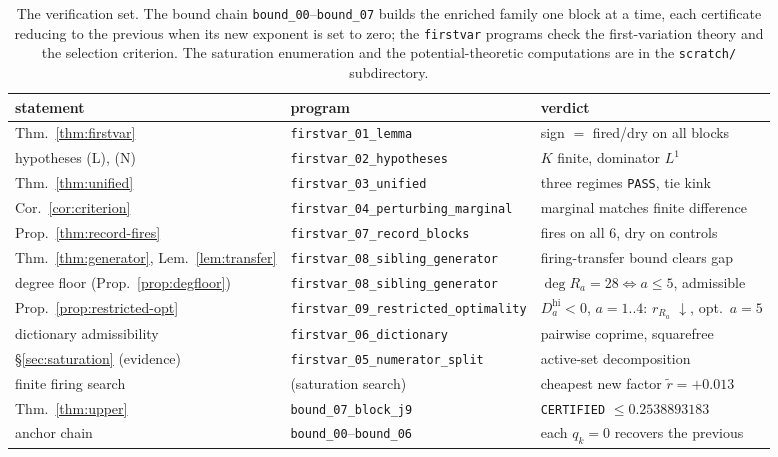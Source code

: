 \documentclass[11pt,reqno]{amsart}
\theoremstyle{plain}
\theoremstyle{definition}
\theoremstyle{remark}
\newcommand{\rb}[1]{r_{#1}}   %
\begin{document}
\begin{table}[ht]
\centering\small
\renewcommand{\arraystretch}{1.15}
\begin{tabular}{@{}lll@{}}
\toprule
statement & program & verdict\\
\midrule
Thm.~\ref{thm:firstvar} & \texttt{firstvar\_01\_lemma} & sign $=$ fired/dry on all blocks\\
\quad hypotheses (L), (N) & \texttt{firstvar\_02\_hypotheses} & $K$ finite, dominator $L^1$\\
Thm.~\ref{thm:unified} & \texttt{firstvar\_03\_unified} & three regimes \texttt{PASS}, tie kink\\
Cor.~\ref{cor:criterion} & \texttt{firstvar\_04\_perturbing\_marginal} & marginal matches finite difference\\
Prop.~\ref{thm:record-fires} & \texttt{firstvar\_07\_record\_blocks} & fires on all 6, dry on controls\\
Thm.~\ref{thm:generator}, Lem.~\ref{lem:transfer} & \texttt{firstvar\_08\_sibling\_generator} & firing-transfer bound clears gap\\
\quad degree floor (Prop.~\ref{prop:degfloor}) & \texttt{firstvar\_08\_sibling\_generator} & $\deg R_a{=}28\!\iff\!a{\le}5$, admissible\\
Prop.~\ref{prop:restricted-opt} & \texttt{firstvar\_09\_restricted\_optimality} & $D_a^{\mathrm{hi}}{<}0$, $a{=}1..4$: $\rb{R_a}$ $\downarrow$, opt.\ $a{=}5$\\
\quad dictionary admissibility & \texttt{firstvar\_06\_dictionary} & pairwise coprime, squarefree\\
\S\ref{sec:saturation} (evidence) & \texttt{firstvar\_05\_numerator\_split} & active-set decomposition\\
\quad finite firing search & (saturation search) & cheapest new factor $\widetilde r=+0.013$\\
Thm.~\ref{thm:upper} & \texttt{bound\_07\_block\_j9} & \texttt{CERTIFIED} $\le0.2538893183$\\
\quad anchor chain & \texttt{bound\_00}--\texttt{bound\_06} & each $q_k{=}0$ recovers the previous\\
\bottomrule
\end{tabular}
\medskip
\caption{The verification set. The bound chain \texttt{bound\_00}--\texttt{bound\_07}
builds the enriched family one block at a time, each certificate reducing to the
previous when its new exponent is set to zero; the \texttt{firstvar} programs check
the first-variation theory and the selection criterion. The saturation enumeration and
the potential-theoretic computations are in the \texttt{scratch/} subdirectory.}
\label{tab:verify}
\end{table}
\end{document}
